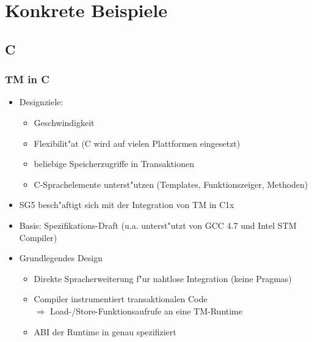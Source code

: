 \documentclass[t]{beamer}
\newcommand{\Rplus}{\protect\raisebox{.1ex}{+}}
\newcommand{\Cpp}{\mbox{C\Rplus\Rplus}\xspace}
\newcommand{\CppNext}{\mbox{C\Rplus\Rplus1x}\xspace}
\begin{document}
\section{Konkrete Beispiele}
\subsection{\Cpp}






\begin{frame}
  \frametitle{TM in \Cpp}

  \begin{itemize}
  \item Designziele:
    \begin{itemize}
    \item Geschwindigkeit
    \item Flexibilit"at (\Cpp wird auf vielen Plattformen eingesetzt)
    \item beliebige Speicherzugriffe in Transaktionen
    \item \Cpp-Sprachelemente unterst"utzen (Templates, Funktionszeiger, Methoden)
    \end{itemize}
  \item SG5 besch"aftigt sich mit der Integration von TM in \CppNext \cite{SG5Status}
  \item Basis: Spezifikations-Draft \cite{C++TMDraft-1.1}
        (u.a. unterst"utzt von GCC 4.7 und Intel STM Compiler)
  \item Grundlegendes Design
    \begin{itemize}
    \item Direkte Spracherweiterung f"ur nahtlose Integration (keine Pragmas)
    \item Compiler instrumentiert transaktionalen Code \\
          $\Rightarrow$ Load-/Store-Funktionsaufrufe an eine TM-Runtime
    \item ABI der Runtime in \cite{TMABI-1.1} genau spezifiziert
    \end{itemize}
  \end{itemize}

\end{frame}
\end{document}
